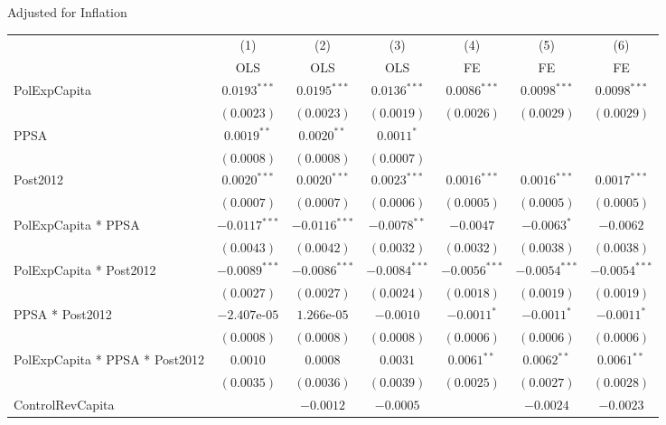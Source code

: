 \begin{table}[H]
    \centering
    \scriptsize
    \begin{minipage}{\textwidth}
    \centering
    {\normalsize Adjusted for Inflation}
    \vspace{6pt}
    \begin{tabular}{lcccccc}
        \toprule
         & (1) & (2) & (3) & (4) & (5) & (6) \\
         & OLS & OLS & OLS & FE & FE & FE \\
        \midrule
        PolExpCapita & $0.0193^{***}$ & $0.0195^{***}$ & $0.0136^{***}$ & $0.0086^{***}$ & $0.0098^{***}$ & $0.0098^{***}$ \\
         & $(0.0023)$ & $(0.0023)$ & $(0.0019)$ & $(0.0026)$ & $(0.0029)$ & $(0.0029)$ \\[4pt]
        PPSA & $0.0019^{**}$ & $0.0020^{**}$ & $0.0011^{*}$ &  &  &  \\
         & $(0.0008)$ & $(0.0008)$ & $(0.0007)$ &  &  &  \\[4pt]
        Post2012 & $0.0020^{***}$ & $0.0020^{***}$ & $0.0023^{***}$ & $0.0016^{***}$ & $0.0016^{***}$ & $0.0017^{***}$ \\
         & $(0.0007)$ & $(0.0007)$ & $(0.0006)$ & $(0.0005)$ & $(0.0005)$ & $(0.0005)$ \\[4pt]
        PolExpCapita * PPSA & $-0.0117^{***}$ & $-0.0116^{***}$ & $-0.0078^{**}$ & $-0.0047$ & $-0.0063^{*}$ & $-0.0062$ \\
         & $(0.0043)$ & $(0.0042)$ & $(0.0032)$ & $(0.0032)$ & $(0.0038)$ & $(0.0038)$ \\[4pt]
        PolExpCapita * Post2012 & $-0.0089^{***}$ & $-0.0086^{***}$ & $-0.0084^{***}$ & $-0.0056^{***}$ & $-0.0054^{***}$ & $-0.0054^{***}$ \\
         & $(0.0027)$ & $(0.0027)$ & $(0.0024)$ & $(0.0018)$ & $(0.0019)$ & $(0.0019)$ \\[4pt]
        PPSA * Post2012 & $-2.407\text{e-}05$ & $1.266\text{e-}05$ & $-0.0010$ & $-0.0011^{*}$ & $-0.0011^{*}$ & $-0.0011^{*}$ \\
         & $(0.0008)$ & $(0.0008)$ & $(0.0008)$ & $(0.0006)$ & $(0.0006)$ & $(0.0006)$ \\[4pt]
        PolExpCapita * PPSA * Post2012 & $0.0010$ & $0.0008$ & $0.0031$ & $0.0061^{**}$ & $0.0062^{**}$ & $0.0061^{**}$ \\
         & $(0.0035)$ & $(0.0036)$ & $(0.0039)$ & $(0.0025)$ & $(0.0027)$ & $(0.0028)$ \\[4pt]
        ControlRevCapita &  & $-0.0012$ & $-0.0005$ &  & $-0.0024$ & $-0.0023$ \\

\end{tabular}
\end{minipage}
\end{table}
